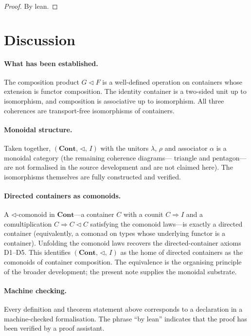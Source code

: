 \documentclass[11pt,a4paper]{article}
\theoremstyle{plain}
\theoremstyle{definition}
\newcommand{\Cont}{\mathbf{Cont}}
\newcommand{\compop}{\mathbin{\triangleleft}}
\begin{document}
\begin{proof}
By lean.
\end{proof}

\section{Discussion}

\paragraph{What has been established.}
The composition product $G\compop F$ is a well-defined operation on containers
whose extension is functor composition. The identity container is a two-sided
unit up to isomorphism, and composition is associative up to isomorphism. All
three coherences are transport-free isomorphisms of containers.

\paragraph{Monoidal structure.}
Taken together, $(\Cont,\,\compop,\,I)$ with the unitors $\lambda$, $\rho$ and
associator $\alpha$ is a monoidal category (the remaining coherence diagrams---
triangle and pentagon---are not formalised in the source development and are
not claimed here). The isomorphisms themselves are fully constructed and
verified.

\paragraph{Directed containers as comonoids.}
A $\compop$-comonoid in $\Cont$---a container $C$ with a counit
$C\Rightarrow I$ and a comultiplication $C\Rightarrow C\compop C$ satisfying
the comonoid laws---is exactly a directed container (equivalently, a comonad
on types whose underlying functor is a container). Unfolding the comonoid laws
recovers the directed-container axioms D1--D5. This identifies
$(\Cont,\,\compop,\,I)$ as the home of directed containers as the comonoids of
container composition. The equivalence is the organising principle of the
broader development; the present note supplies the monoidal substrate.

\paragraph{Machine checking.}
Every definition and theorem statement above corresponds to a declaration in a
machine-checked formalisation. The phrase ``by lean'' indicates that the proof
has been verified by a proof assistant.
\end{document}
